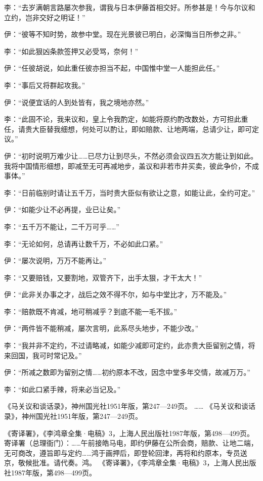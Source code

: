 \documentclass[12pt,UTF8]{ctexbook}
\begin{document}
李：“去岁满朝言路屡次参我，谓我与日本伊藤首相交好。所参甚是！今与尔议和立约，岂非交好之明证！”

伊：“彼等不知时势，故参中堂。现在光景彼已明白，必深悔当日所参之非。”

李：“如此狠凶条款签押又必受骂，奈何！”

伊：“任彼胡说，如此重任彼亦担当不起，中国惟中堂一人能担此任。”

李：“事后又将群起攻我。”

伊：“说便宜话的人到处皆有，我之境地亦然。”

李：“此固不论，我来议和，皇上令我酌定，如能将原约酌改数处，方可担此重任，请贵大臣替我细想，何处可以酌让，即如赔款、让地两端，总请少让，即可定议。”

伊：“初时说明万难少让……已尽力让到尽头，不然必须会议四五次方能让到如此。我将中国情形细想，即减至无可再减地步，盖议和非若市井买卖，彼此争价，不成事体。”

李：“日前临别时请让五千万，当时贵大臣似有欲让之意，如能让此，全约可定。”

伊：“如能少让不必再提，业已让矣。”

李：“五千万不能让，二千万可乎……”

李：“无论如何，总请再让数千万，不必如此口紧。”

伊：“屡次说明，万万不能再让。”

李：“又要赔钱，又要割地，双管齐下，出手太狠，才干太大！”

伊：“此非关办事之才，战后之效不得不尔，如与中堂比才，万不能及。”

李：“赔款既不肯减，地可稍减乎？到底不能一毛不拔。”

伊：“两件皆不能稍减，屡次言明，此系尽头地步，不能少改。”

李：“我并非不定约，不过请略减，如能少减即可定约，此亦贵大臣留别之情，将来回国，我可时常记及。”

伊：“所减之数即为留别之情……初约原本不改，因念中堂多年交情，故减万万。”

李：“如此口紧手辣，将来必当记及。”

《马关议和谈话录》，神州国光社1951年版，第247—249页。
…… 《马关议和谈话录》，神州国光社1951年版，第247—249页。

《寄译署》，《李鸿章全集·电稿》3，上海人民出版社1987年版，第498—499页。
寄译署（总理衙门）：……午前接皓马电，即约伊藤在公所会商，赔款、让地二端，无可商改，遵旨即与定约……鸿于画押后，即登轮回津，再将和约原本，专员送京，敬候批准。请代奏。鸿。 《寄译署》，《李鸿章全集·电稿》3，上海人民出版社1987年版，第498—499页。
\end{document}
